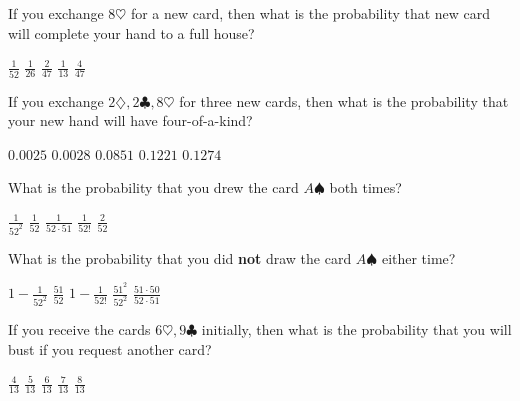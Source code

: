 \documentclass[answers,12pt]{exam}
\begin{document}
\begin{questions}
\question\label{FirstPoker} 
If you exchange $8\heartsuit$ for a new card,
then what is the probability that new card
will complete your hand to a full house?\\
\begin{oneparchoices}
\choice $\frac{1}{52}$
\choice $\frac{1}{26}$ %
\choice $\frac{2}{47}$ %
\choice $\frac{1}{13}$ %
\correctchoice $\frac{4}{47}$
\end{oneparchoices}

\question\label{LastPoker}
If you exchange $2\diamondsuit,2\clubsuit,8\heartsuit$ for three
new cards, then what is the probability that your new hand
will have four-of-a-kind?\\
\begin{oneparchoices}
\choice $0.0025$ %
\correctchoice $0.0028$
\choice $0.0851$ %
\choice $0.1221$ %
\choice $0.1274$ %
\end{oneparchoices}


\question\label{FirstDeck} What is the probability that you
drew the card $A\spadesuit$ both times?\\
\begin{oneparchoices}
\correctchoice $\frac{1}{52^2}$
\choice $\frac{1}{52}$
\choice $\frac{1}{52\cdot 51}$
\choice $\frac{1}{52!}$
\choice $\frac{2}{52}$
\end{oneparchoices}

\question\label{LastDeck} What is the probability that you
did {\bf not} draw the card $A\spadesuit$ either time?\\
\begin{oneparchoices}
\choice $1-\frac{1}{52^2}$
\choice $\frac{51}{52}$
\choice $1-\frac{1}{52!}$
\correctchoice $\frac{51^2}{52^2}$
\choice $\frac{51\cdot 50}{52\cdot 51}$
\end{oneparchoices}


\question\label{FirstBJ}
If you receive the cards $6\heartsuit,9\clubsuit$
initially, then what is the probability that you will bust if you
request another card?\\
\begin{oneparchoices}
\choice $\frac{4}{13}$
\choice $\frac{5}{13}$
\choice $\frac{6}{13}$ %
\correctchoice $\frac{7}{13}$
\choice $\frac{8}{13}$ %
\end{oneparchoices}


\end{questions}
\end{document}
